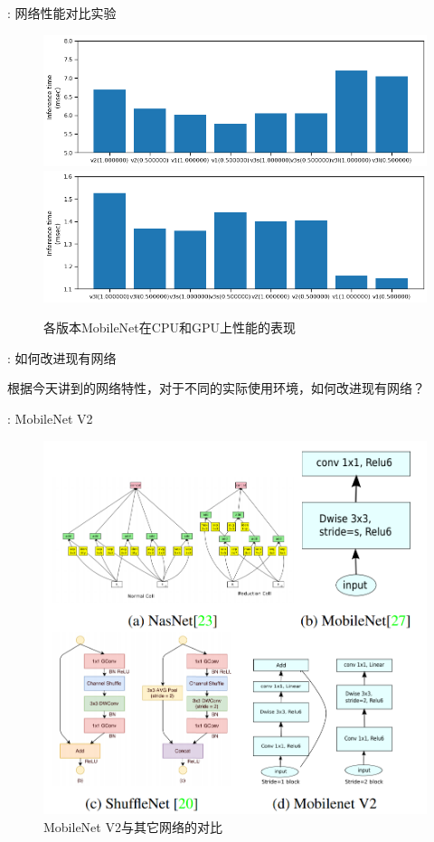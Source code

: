 \documentclass[UTF8, fontset=founder, aspectratio=43, 10pt, t]{ctexbeamer}
\begin{document}
\begin{frame}{\titleprefix: 网络性能对比实验}
	\begin{figure}
		\centering
		\includegraphics[width=0.7\linewidth]{Images/mobilenetcomp}
		\includegraphics[width=0.7\linewidth]{Images/mobilenetcompgpu}
		\caption{各版本MobileNet在CPU和GPU上性能的表现}
		\label{fig:mobilenetcomp}
	\end{figure}
	
\end{frame}

\begin{frame}{\titleprefix: 如何改进现有网络}
	
	根据今天讲到的网络特性，对于不同的实际使用环境，如何改进现有网络？
	
\end{frame}

\begin{frame}{\titleprefix: MobileNet V2}
	\begin{figure}
		\centering
		\includegraphics[width=0.6\linewidth]{Images/mobilenetv2}
		\caption{MobileNet V2与其它网络的对比}
		\label{fig:mobilenetv2}
	\end{figure}
	
\end{frame}
\end{document}
